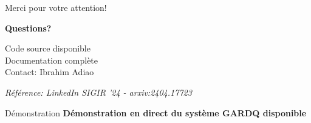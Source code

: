 \documentclass[10pt, aspectratio=169]{beamer}
\begin{document}
\begin{frame}{Merci pour votre attention!}
    \begin{center}
        \Huge \textbf{Questions?}
        
        \vspace{1cm}
        
        \Large
        \faGithub{} Code source disponible\\
        \faBook{} Documentation complète\\
        \faEnvelope{} Contact: Ibrahim Adiao
        
        \vspace{1cm}
        
        \normalsize
        \textit{Référence: LinkedIn SIGIR '24 - arxiv:2404.17723}
    \end{center}
    
    \vspace{0.5cm}
    \begin{block}{Démonstration}
        \centering
        \textbf{Démonstration en direct du système GARDQ disponible}
    \end{block}
\end{frame}
\end{document}
